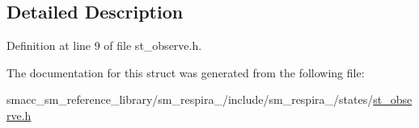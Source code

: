 \subsection{Detailed Description}


Definition at line 9 of file st\+\_\+observe.\+h.



The documentation for this struct was generated from the following file\+:\begin{DoxyCompactItemize}
\item 
smacc\+\_\+sm\+\_\+reference\+\_\+library/sm\+\_\+respira\+\_/include/sm\+\_\+respira\+\_/states/\hyperlink{sm__respira__1_2include_2sm__respira__1_2states_2st__observe_8h}{st\+\_\+observe.\+h}\end{DoxyCompactItemize}
